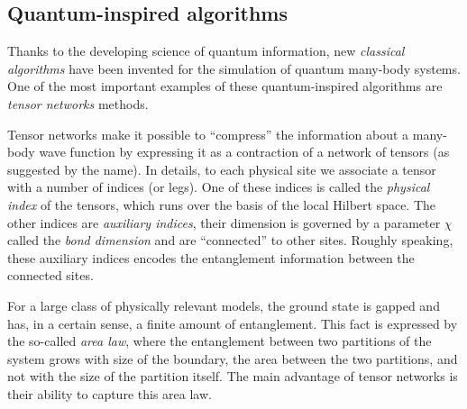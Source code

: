 

\subsection{Quantum-inspired algorithms}
\label{sub:quantum_inspired_algorithms}

Thanks to the developing science of quantum information, new \emph{classical algorithms} have been invented for the simulation of quantum many-body systems.
One of the most important examples of these quantum-inspired algorithms are \emph{tensor networks} methods\citneeded.

Tensor networks make it possible to ``compress'' the information about a many-body wave function by expressing it as a contraction of a network of tensors (as suggested by the name).
In details, to each physical site we associate a tensor with a number of indices (or legs).
One of these indices is called the \emph{physical index} of the tensors, which runs over the basis of the local Hilbert space.
The other indices are \emph{auxiliary indices}, their dimension is governed by a parameter $\chi$ called the \emph{bond dimension} and are ``connected'' to other sites.
Roughly speaking, these auxiliary indices encodes the entanglement information between the connected sites.

For a large class of physically relevant models, the ground state is gapped and has, in a certain sense, a finite amount of entanglement.
This fact is expressed by the so-called \emph{area law}, where the entanglement between two partitions of the system grows with size of the boundary, the area between the two partitions, and not with the size of the partition itself.
The main advantage of tensor networks is their ability to capture this area law.

